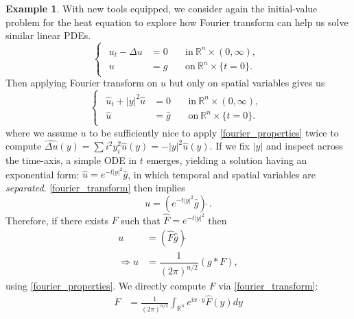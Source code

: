 \documentclass[openany, amssymb, psamsfonts]{amsart}
\theoremstyle{definition}
\newtheorem{exmp}{Example}[section]
\numberwithin{equation}{section}
\newcommand{\bbr}{\mathbb{R}}
\let\implies\Rightarrow
\begin{document}
\begin{exmp}
With new tools equipped, we consider again the initial-value problem for the heat equation to explore how Fourier transform can help us solve similar linear PDEs.
    \begin{equation*}
        \begin{cases}
            \begin{aligned}
                u_t - \Delta u &= 0 &&\:\text{in}\: \bbr^n \times (0, \infty) ,\\
                u &= g && \:\text{on}\: \bbr^n \times \{t = 0\} .
            \end{aligned}
        \end{cases}
    \end{equation*}
    Then applying Fourier transform on $u$ but only on spatial variables gives us
    \begin{equation*}
        \begin{cases}
            \begin{aligned}
                \hat{u}_t + |y|^2 \hat{u} &= 0 && \:\text{in}\: \bbr^n \times (0, \infty) ,\\
                \hat{u} &= \hat{g} && \:\text{on}\: \bbr^n \times \{t = 0\} .
            \end{aligned}
        \end{cases}
    \end{equation*}
    where we assume $u$ to be sufficiently nice to apply \autoref{fourier_properties} twice to compute $\widehat{\Delta u}(y) = \sum i^2 y_i^2 \hat{u}(y) = - |y|^2 \hat{u} (y)$. If we fix $|y|$ and inspect across the time-axis, a simple ODE in $t$ emerges, yielding a solution having an exponential form: $\hat{u} = e^{-t|y|^2} \hat{g}$, in which temporal and spatial variables are \textit{separated}. \autoref{fourier_transform} then implies
    \begin{equation*}
        u = (e^{-t|y|^2} \hat{g}) \check{~}.
    \end{equation*}
    Therefore, if there exists $F$ such that $\hat{F} = e^{-t|y|^2}$ then \begin{align} \label{fourier_u_g_F}
        u &= (\hat{F} \hat{g})\check{} \nonumber \\
        \implies u &= \dfrac{1}{(2\pi)^{n/2}} (g * F),
    \end{align}
    using \autoref{fourier_properties}. We directly compute $F$ via \autoref{fourier_transform}: 
    \begin{align*}  
        F &= \frac{1}{(2\pi)^{n/2}}\int_{\bbr^n} e^{ix \cdot y} \hat{F}(y) dy \\

\end{align*}
\end{exmp}
\end{document}
